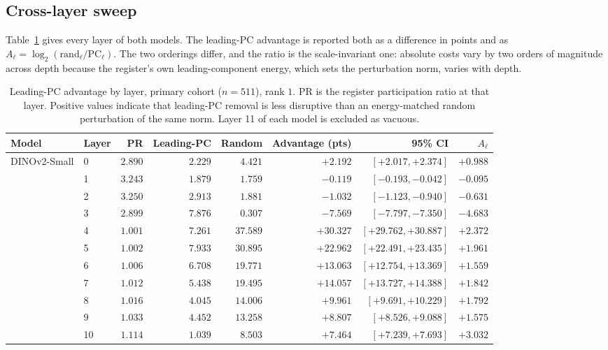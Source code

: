 \documentclass{article}
\begin{document}
\subsection{Cross-layer sweep}

Table~\ref{tab:crosslayer-full} gives every layer of both models. The leading-PC advantage is reported both as a difference in points and as $A_\ell = \log_2(\text{rand}_\ell/\text{PC}_\ell)$. The two orderings differ, and the ratio is the scale-invariant one: absolute costs vary by two orders of magnitude across depth because the register's own leading-component energy, which sets the perturbation norm, varies with depth.

\begin{table}[h]
\centering
\caption{Leading-PC advantage by layer, primary cohort ($n=511$), rank $1$. PR is the register participation ratio at that layer. Positive values indicate that leading-PC removal is less disruptive than an energy-matched random perturbation of the same norm. Layer 11 of each model is excluded as vacuous.}
\label{tab:crosslayer-full}
\footnotesize
\setlength{\tabcolsep}{4pt}
\begin{tabular}{llrrrrrr}
\toprule
Model & Layer & PR & Leading-PC & Random & Advantage (pts) & 95\% CI & $A_\ell$ \\
\midrule
DINOv2-Small & 0 & $2.890$ & $2.229$ & $4.421$ & $+2.192$ & $[+2.017, +2.374]$ & $+0.988$ \\
 & 1 & $3.243$ & $1.879$ & $1.759$ & $-0.119$ & $[-0.193, -0.042]$ & $-0.095$ \\
 & 2 & $3.250$ & $2.913$ & $1.881$ & $-1.032$ & $[-1.123, -0.940]$ & $-0.631$ \\
 & 3 & $2.899$ & $7.876$ & $0.307$ & $-7.569$ & $[-7.797, -7.350]$ & $-4.683$ \\
 & 4 & $1.001$ & $7.261$ & $37.589$ & $+30.327$ & $[+29.762, +30.887]$ & $+2.372$ \\
 & 5 & $1.002$ & $7.933$ & $30.895$ & $+22.962$ & $[+22.491, +23.435]$ & $+1.961$ \\
 & 6 & $1.006$ & $6.708$ & $19.771$ & $+13.063$ & $[+12.754, +13.369]$ & $+1.559$ \\
 & 7 & $1.012$ & $5.438$ & $19.495$ & $+14.057$ & $[+13.727, +14.388]$ & $+1.842$ \\
 & 8 & $1.016$ & $4.045$ & $14.006$ & $+9.961$ & $[+9.691, +10.229]$ & $+1.792$ \\
 & 9 & $1.033$ & $4.452$ & $13.258$ & $+8.807$ & $[+8.526, +9.088]$ & $+1.575$ \\
 & 10 & $1.114$ & $1.039$ & $8.503$ & $+7.464$ & $[+7.239, +7.693]$ & $+3.032$ \\

\end{tabular}
\end{table}
\end{document}
